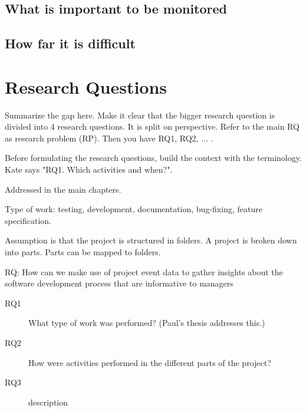 \subsection{What is important to be monitored}

\subsection{How far it is difficult}

\section{Research Questions}
\label{sec:ch2-research-questions}

Summarize the gap here. Make it clear that the bigger research question is divided into 4 research questions. It is split on perspective. 
Refer to the main RQ as research problem (RP). Then you have RQ1, RQ2, ... .


Before formulating the research questions, build the context with the terminology. Kate says "RQ1. Which activities and when?".


Addressed in the main chapters.

Type of work: testing, development, documentation, bug-fixing, feature specification. 

Assumption is that the project is structured in folders. A project is broken down into parts. Parts can be mapped to folders.

RQ: How can we make use of project event data to gather insights about the software development process that are
informative to managers

\begin{description}
	\item[RQ1] What type of work was performed? 
	(Paul's thesis addresses this.)
	\item[RQ2] How were activities performed in the different parts of the project?
	\item[RQ3] description
\end{description}

